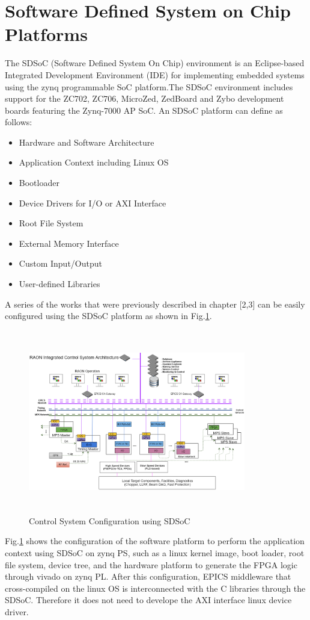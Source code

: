 \documentclass[journal]{IEEEtran}
\begin{document}
\section{Software Defined System on Chip Platforms}
The SDSoC (Software Defined System On Chip)\cite{sdsoc} environment is an Eclipse-based Integrated Development Environment (IDE) for implementing embedded systems using the zynq programmable SoC platform.The SDSoC environment includes support for the ZC702, ZC706, MicroZed, ZedBoard and Zybo development boards featuring the Zynq-7000 AP SoC.
\hfil\break\hfil\break
An SDSoC platform can define as follows:
\begin{itemize}
 	\item Hardware and Software Architecture
 	\item Application Context including Linux OS
 	\item Bootloader
 	\item Device Drivers for I/O or AXI Interface
 	\item Root File System
	\item External Memory Interface
	\item Custom Input/Output
	\item User-defined Libraries
\end{itemize}
A series of the works that were previously described in chapter [2,3] can be easily configured using the SDSoC platform as shown in Fig.\ref{sdsoc_control_system}. 
\begin{figure}[!htb]
	\centering
	\includegraphics*[width=95mm, height=80mm]{img01.png}
	\caption{Control System Configuration using SDSoC}
	\label{sdsoc_control_system}
\end{figure}

Fig.\ref{sdsoc_control_system} shows the configuration of the software platform to perform the application context using SDSoC on zynq PS, such as a linux kernel image, boot loader, root file system, device tree, and  the hardware platform to generate the FPGA logic through vivado on zynq PL. After this configuration, EPICS middleware that cross-compiled on the linux OS is interconnected with the C libraries through the SDSoC. Therefore it does not need to develope the AXI interface linux device driver.
\end{document}

